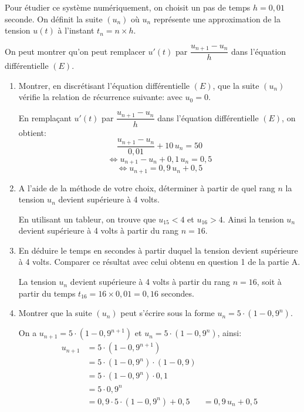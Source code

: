 Pour étudier ce système numériquement, on choisit un pas de temps $h=0,01$ seconde. On définit la suite $(u_n)$ où $u_n$ représente une approximation de la tension $u(t)$ à l'instant $t_n=n \times h$.

On peut montrer qu'on peut remplacer $u'(t)$ par $\dfrac{u_{n+1}-u_n}{h}$ dans l'équation différentielle $(E)$.


\begin{enumerate}[series=monDS, resume]
    \item Montrer, en discrétisant l'équation différentielle $(E)$, que la suite $(u_n)$ vérifie la relation de récurrence suivante:  avec $u_0=0$.
    \begin{blocvisiblex}[height=4.5]
    {\quad}
    En remplaçant $u'(t)$ par $\dfrac{u_{n+1}-u_n}{h}$ dans l'équation différentielle $(E)$, on obtient:
\[\dfrac{u_{n+1}-u_n}{0,01}+10\, u_n=50\]
\[\Leftrightarrow u_{n+1}-u_n+0,1\, u_n=0,5\]
\[\Leftrightarrow u_{n+1}=0,9\, u_n + 0,5\]
    \end{blocvisiblex}
    \medskip

    \item A l'aide de la méthode de votre choix, déterminer à partir de quel rang $n$ la tension $u_n$ devient supérieure à 4 volts.
    \begin{blocvisiblex}[height=2.5]
    {\quad}
    En utilisant un tableur, on trouve que $u_{15}<4$ et $u_{16}>4$. Ainsi la tension $u_n$ devient supérieure à 4 volts à partir du rang $n=16$.
    \end{blocvisiblex}
    \par\par\medskip
    \medskip
    \item En déduire le temps en secondes à partir duquel la tension devient supérieure à 4 volts. Comparer ce résultat avec celui obtenu en question 1 de la partie A.
    \begin{blocvisiblex}[height=2.5]
    {\quad}
    La tension $u_n$ devient supérieure à 4 volts à partir du rang $n=16$, soit à partir du temps $t_{16}=16 \times 0,01=0,16$ secondes.

    \end{blocvisiblex}
    \par\par\medskip
    \item Montrer que la suite $(u_n)$ peut s'écrire sous la forme $u_n=5\cdot (1-0,9^n)$.
    \begin{blocvisiblex}[height=5]
    {\quad}
    On a $u_{n+1}=5\cdot (1-0,9^{n+1})$ et $u_n=5\cdot (1-0,9^n)$, ainsi:
\begin{align*}
    u_{n+1}&=5\cdot (1-0,9^{n+1})\\
    &=5\cdot (1-0,9^n)\cdot (1-0,9)\\
    &=5\cdot (1-0,9^n)\cdot 0,1\\
    &=5\cdot 0,9^n\\
    &=0,9 \cdot 5\cdot (1-0,9^n)+0,5
    &=0,9\, u_n + 0,5
\end{align*}

    \end{blocvisiblex}
    \medskip


    \end{enumerate}


